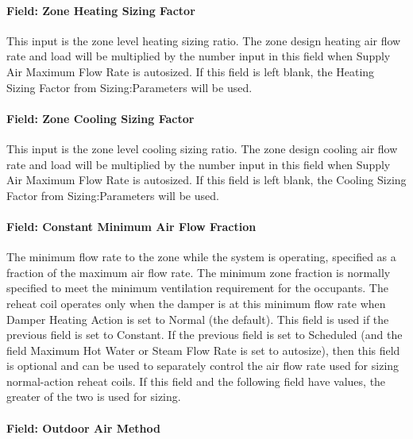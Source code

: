 \paragraph{Field: Zone Heating Sizing Factor}\label{field-zone-heating-sizing-factor-9}

This input is the zone level heating sizing ratio. The zone design heating air flow rate and load will be multiplied by the number input in this field when Supply Air Maximum Flow Rate is autosized. If this field is left blank, the Heating Sizing Factor from Sizing:Parameters will be used.

\paragraph{Field: Zone Cooling Sizing Factor}\label{field-zone-cooling-sizing-factor-8}

This input is the zone level cooling sizing ratio. The zone design cooling air flow rate and load will be multiplied by the number input in this field when Supply Air Maximum Flow Rate is autosized. If this field is left blank, the Cooling Sizing Factor from Sizing:Parameters will be used.

\paragraph{Field: Constant Minimum Air Flow Fraction}\label{field-constant-minimum-air-flow-fraction-1-000}

The minimum flow rate to the zone while the system is operating, specified as a fraction of the maximum air flow rate. The minimum zone fraction is normally specified to meet the minimum ventilation requirement for the occupants. The reheat coil operates only when the damper is at this minimum flow rate when Damper Heating Action is set to Normal (the default). This field is used if the previous field is set to Constant. If the previous field is set to Scheduled (and the field Maximum Hot Water or Steam Flow Rate is set to autosize), then this field is optional and can be used to separately control the air flow rate used for sizing normal-action reheat coils. If this field and the following field have values, the greater of the two is used for sizing.

\paragraph{Field: Outdoor Air Method}\label{field-outdoor-air-method-10}

